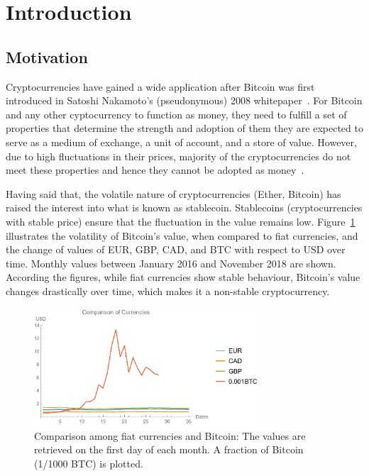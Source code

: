 
\section{Introduction}\label{Intro} 



\subsection{Motivation} %
Cryptocurrencies have gained a wide application after Bitcoin was first introduced in Satoshi Nakamoto’s (pseudonymous) 2008 whitepaper~\cite{nakamoto2008bitcoin}. For Bitcoin and any other cyptocurrency to function as money, they need to fulfill a set of properties that determine the strength and adoption of them \ie they are expected to serve as a medium of exchange, a unit of account, and a store of value. However, due to high fluctuations in their prices, majority of the cryptocurrencies do not meet these properties and hence they cannot be adopted as money~\cite{overview}.

Having said that, the volatile nature of cryptocurrencies (\eg Ether, Bitcoin) has raised the interest into what is known as stablecoin. Stablecoins (\ie cryptocurrencies with stable price) ensure that the fluctuation in the value remains low. Figure~\ref{fig:btcandfiat} illustrates the volatility of Bitcoin's value, when compared to fiat currencies, and the change of values of EUR, GBP, CAD, and BTC with respect to USD over time. Monthly values between January 2016 and November 2018 are shown. According the figures, while fiat currencies show stable behaviour, Bitcoin's value changes drastically over time, which makes it a non-stable cryptocurrency.

\begin{figure}[!htb]
	\centering
	\includegraphics[width=0.75\textwidth]{figures/graph1.pdf}
	\caption{\label{fig:btcandfiat}Comparison among fiat currencies and Bitcoin: The values are retrieved on the first day of each month. A fraction of Bitcoin (1/1000 BTC) is plotted.}
\end{figure}

